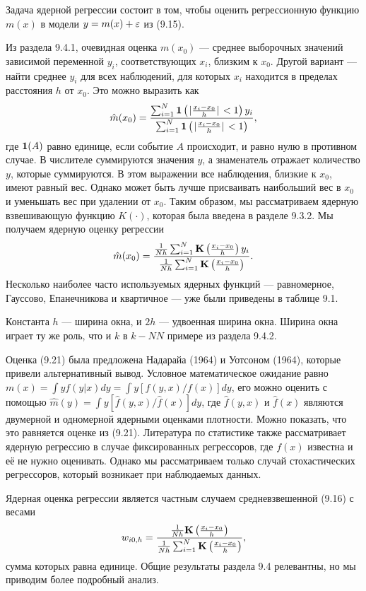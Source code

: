 Задача ядерной регрессии состоит в том, чтобы оценить регрессионную функцию $m(x)$ в модели $y = m(x) + \varepsilon$ из (9.15).

Из раздела 9.4.1, очевидная оценка $m(x_0)$ --- среднее выборочных значений зависимой переменной $y_i$, соответствующих $x_i$, близким к $x_0$. Другой вариант --- найти среднее $y_i$ для всех наблюдений, для которых $x_i$ находится в пределах расстояния $h$ от $x_0$. Это можно выразить как
\[
\hat{m}(x_0) = \frac{\sum_{i=1}^N {\bf{1}} \left( \left. |\frac{x_i - x_0}{h}| \right. < 1 \right)y_i}{\sum_{i=1}^N {\bf{1}} \left( \left. | \frac{x_i - x_0}{h}| \right. < 1 \right)},
\]
где ${\bf{1}}(A)$ равно единице, если событие $A$ происходит, и равно нулю в противном случае. В числителе суммируются значения $y$, а знаменатель отражает количество $y$, которые суммируются. В этом выражении все наблюдения, близкие к $x_0$, имеют равный вес. Однако может быть лучше присваивать наибольший вес в $x_0$ и уменьшать вес при удалении от $x_0$. Таким образом, мы рассматриваем ядерную взвешивающую функцию $K(\cdot)$, которая была введена в разделе 9.3.2. Мы получаем ядерную оценку регрессии
\begin{equation}
\hat{m}(x_0) = \frac{\frac{1}{Nh}\sum_{i=1}^N {\bf{K}} \left( \frac{x_i - x_0}{h} \right)y_i}{\frac{1}{Nh}\sum_{i=1}^N {\bf{K}} \left( \frac{x_i - x_0}{h} \right)}.
\end{equation}
Несколько наиболее часто используемых ядерных функций --- равномерное, Гауссово, Епанечникова и квартичное --- уже были приведены в таблице 9.1.

Константа $h$ --- ширина окна, и $2h$ --- удвоенная ширина окна. Ширина окна играет ту же роль, что и $k$ в $k - NN$ примере из раздела 9.4.2.

Оценка (9.21) была предложена Надарайа (1964) и Уотсоном (1964), которые привели альтернативный вывод. Условное математическое ожидание равно $m(x) = \int yf(y|x)dy = \int y[f(y,x)/f(x)]dy$, его можно оценить с помощью $\hat{m}(y) = \int y[\hat{f}(y,x)/\hat{f}(x)]dy$, где $\hat{f}(y,x)$ и $\hat{f}(x)$ являются двумерной и одномерной ядерными оценками плотности. Можно показать, что это равняется оценке из (9.21). Литература по статистике также рассматривает ядерную регрессию в случае фиксированных регрессоров, где $f(x)$ известна и её не нужно оценивать. Однако мы рассматриваем только случай стохастических регрессоров, который возникает при наблюдаемых данных.

Ядерная оценка регрессии является частным случаем средневзвешенной (9.16) с весами
\begin{equation}
w_{i0,h} = \frac{\frac{1}{Nh}{\bf{K}} \left( \frac{x_i - x_0}{h} \right)}{\frac{1}{Nh}\sum_{i=1}^N {\bf{K}} \left( \frac{x_i - x_0}{h} \right)},
\end{equation}
сумма которых равна единице. Общие результаты раздела 9.4 релевантны, но мы приводим более подробный анализ. 

